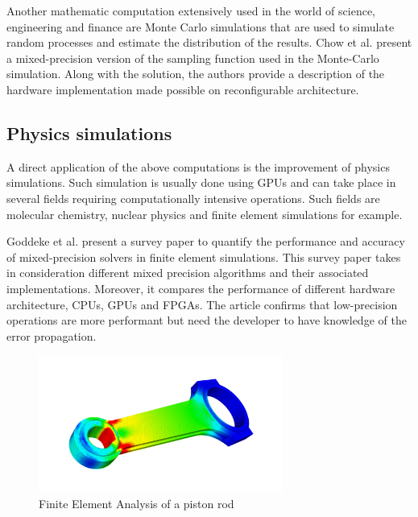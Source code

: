 Another mathematic computation extensively used in the world of science, engineering and finance are Monte Carlo simulations that are used to simulate random processes and estimate the distribution of the results. Chow et al. \cite{Chow2012} present a mixed-precision version of the sampling function used in the Monte-Carlo simulation. Along with the solution, the authors provide a description of the hardware implementation made possible on reconfigurable architecture.


\subsection{Physics simulations}

A direct application of the above computations is the improvement of physics simulations. Such simulation is usually done using GPUs  and can take place in several fields requiring computationally intensive operations. Such fields are molecular chemistry, nuclear physics and finite element simulations for example.

Goddeke et al. \cite{Goddeke2007} present a survey paper to quantify the performance and accuracy of mixed-precision solvers in finite element simulations. This survey paper takes in consideration different mixed precision algorithms and their associated implementations. Moreover, it compares the performance of different hardware architecture, CPUs, GPUs and FPGAs. The article confirms that low-precision operations are more performant but need the developer to have knowledge of the error propagation.

\begin{figure}[htbp]
	\centering
		\includegraphics[width=8cm]{Figures/FESim.png}
	\caption[Finite Element Simulation]{Finite Element Analysis of a piston rod \cite{Simscale}}
	\label{fig:FESim}
\end{figure}

